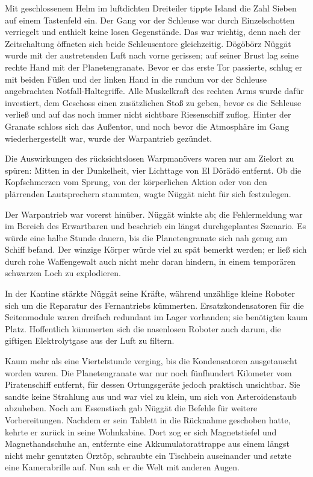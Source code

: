 Mit geschlossenem Helm im luftdichten Dreiteiler tippte Island die Zahl Sieben auf einem Tastenfeld ein. Der Gang vor der Schleuse war durch Einzelschotten verriegelt und enthielt keine losen Gegenstände. Das war wichtig, denn nach der Zeitschaltung öffneten sich beide Schleusentore gleichzeitig. Dögöbörz Nüggät wurde mit der austretenden Luft nach vorne gerissen; auf seiner Brust lag seine rechte Hand mit der Planetengranate. Bevor er das erste Tor passierte, schlug er mit beiden Füßen und der linken Hand in die rundum vor der Schleuse angebrachten Notfall-Haltegriffe. Alle Muskelkraft des rechten Arms wurde dafür investiert, dem Geschoss einen zusätzlichen Stoß zu geben, bevor es die Schleuse verließ und auf das noch immer nicht sichtbare Riesenschiff zuflog. Hinter der Granate schloss sich das Außentor, und noch bevor die Atmosphäre im Gang wiederhergestellt war, wurde der Warpantrieb gezündet.

Die Auswirkungen des rücksichtslosen Warpmanövers waren nur am Zielort zu spüren: Mitten in der Dunkelheit, vier Lichttage von El Dörädö entfernt. Ob die Kopfschmerzen vom Sprung, von der körperlichen Aktion oder von den plärrenden Lautsprechern stammten, wagte Nüggät nicht für sich festzulegen.


Der Warpantrieb war vorerst hinüber. Nüggät winkte ab; die Fehlermeldung war im Bereich des Erwartbaren und beschrieb ein längst durchgeplantes Szenario. Es würde eine halbe Stunde dauern, bis die Planetengranate sich nah genug am Schiff befand. Der winzige Körper würde viel zu spät bemerkt werden; er ließ sich durch rohe Waffengewalt auch nicht mehr daran hindern, in einem temporären schwarzen Loch zu explodieren.

In der Kantine stärkte Nüggät seine Kräfte, während unzählige kleine Roboter sich um die Reparatur des Fernantriebs kümmerten. Ersatzkondensatoren für die Seitenmodule waren dreifach redundant im Lager vorhanden; sie benötigten kaum Platz. Hoffentlich kümmerten sich die nasenlosen Roboter auch darum, die giftigen Elektrolytgase aus der Luft zu filtern.

Kaum mehr als eine Viertelstunde verging, bis die Kondensatoren ausgetauscht worden waren. Die Planetengranate war nur noch fünfhundert Kilometer vom Piratenschiff entfernt, für dessen Ortungsgeräte jedoch praktisch unsichtbar. Sie sandte keine Strahlung aus und war viel zu klein, um sich von Asteroidenstaub abzuheben. Noch am Essenstisch gab Nüggät die Befehle für weitere Vorbereitungen. Nachdem er sein Tablett in die Rücknahme geschoben hatte, kehrte er zurück in seine Wohnkabine. Dort zog er sich Magnetstiefel und Magnethandschuhe an, entfernte eine Akkumulatorattrappe aus einem längst nicht mehr genutzten Örztöp, schraubte ein Tischbein auseinander und setzte eine Kamerabrille auf. Nun sah er die Welt mit anderen Augen.

